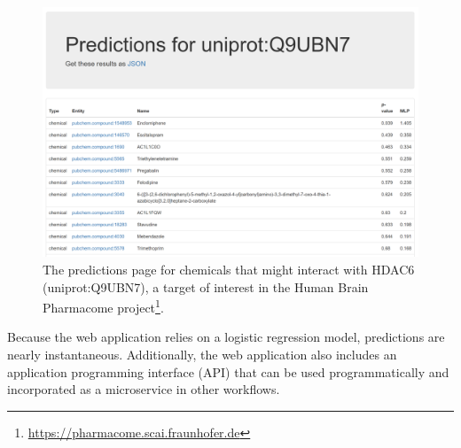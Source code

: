 \begin{figure}[h!]
    \centering
    \includegraphics[scale=0.5]
    {figures/protein_prediction.png}
    \caption[The predictions page for chemicals interacting with HDAC6]{\label{fig:protein_prediction} The predictions page for chemicals that might interact with HDAC6 (uniprot:Q9UBN7), a target of interest in the Human Brain Pharmacome project\footnote{\url{https://pharmacome.scai.fraunhofer.de}}.}
\end{figure}

Because the web application relies on a logistic regression model, predictions are nearly instantaneous.
Additionally, the web application also includes an application programming interface (API) that can be used programmatically and incorporated as a microservice in other workflows.
